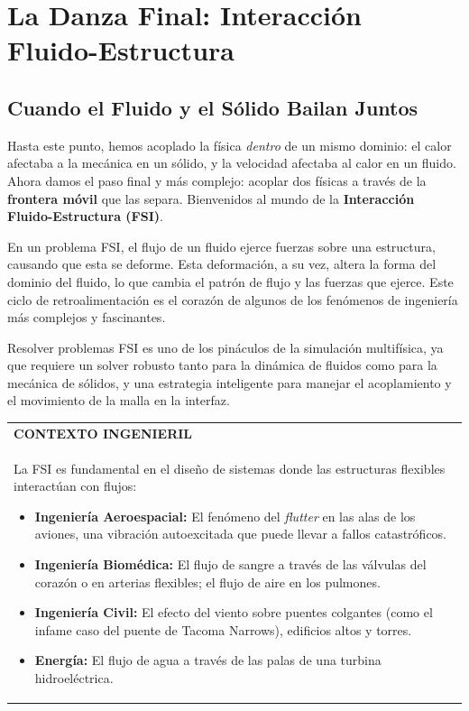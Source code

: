 \chapter{La Danza Final: Interacción Fluido-Estructura}
\label{chap:fsi}

\section{Cuando el Fluido y el Sólido Bailan Juntos}

Hasta este punto, hemos acoplado la física \textit{dentro} de un mismo dominio: el calor afectaba a la mecánica en un sólido, y la velocidad afectaba al calor en un fluido. Ahora damos el paso final y más complejo: acoplar dos físicas a través de la \textbf{frontera móvil} que las separa. Bienvenidos al mundo de la \textbf{Interacción Fluido-Estructura (FSI)}.

En un problema FSI, el flujo de un fluido ejerce fuerzas sobre una estructura, causando que esta se deforme. Esta deformación, a su vez, altera la forma del dominio del fluido, lo que cambia el patrón de flujo y las fuerzas que ejerce. Este ciclo de retroalimentación es el corazón de algunos de los fenómenos de ingeniería más complejos y fascinantes.

Resolver problemas FSI es uno de los pináculos de la simulación multifísica, ya que requiere un solver robusto tanto para la dinámica de fluidos como para la mecánica de sólidos, y una estrategia inteligente para manejar el acoplamiento y el movimiento de la malla en la interfaz.

\begin{center}
\begin{tabular}{|p{}|}
\hline
\textbf{CONTEXTO INGENIERIL} \\
La FSI es fundamental en el diseño de sistemas donde las estructuras flexibles interactúan con flujos:
\begin{itemize}
    \item \textbf{Ingeniería Aeroespacial:} El fenómeno del \textit{flutter} en las alas de los aviones, una vibración autoexcitada que puede llevar a fallos catastróficos.
    \item \textbf{Ingeniería Biomédica:} El flujo de sangre a través de las válvulas del corazón o en arterias flexibles; el flujo de aire en los pulmones.
    \item \textbf{Ingeniería Civil:} El efecto del viento sobre puentes colgantes (como el infame caso del puente de Tacoma Narrows), edificios altos y torres.
    \item \textbf{Energía:} El flujo de agua a través de las palas de una turbina hidroeléctrica.
\end{itemize}
\\
\hline
\end{tabular}
\end{center}

